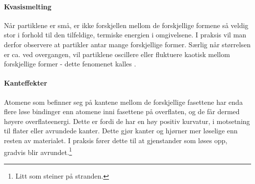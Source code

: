 \paragraph{Kvasismelting} Når partiklene er små, er ikke forskjellen mellom de forskjellige formene så veldig stor i forhold til den tilfeldige, termiske energien i omgivelsene. I praksis vil man derfor observere at partikler antar mange forskjellige former. Særlig når størrelsen er ca. ved overgangen, vil partiklene oscillere eller fluktuere kaotisk mellom forskjellige former - dette fenomenet kalles .

\paragraph{Kanteffekter} Atomene som befinner seg på kantene mellom de forskjellige fasettene har enda flere løse bindinger enn atomene inni fasettene på overflaten, og de får dermed høyere overflateenergi. Dette er fordi de har en høy positiv kurvatur, i motsetning til flater eller avrundede kanter. Dette gjør kanter og hjørner mer løselige enn resten av materialet. I praksis fører dette til at gjenstander som løses opp, gradvis blir avrundet.\footnote{Litt som steiner på stranden.} %


